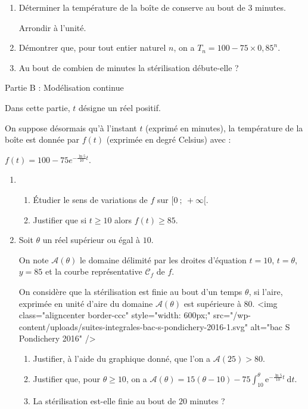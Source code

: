 \begin{enumerate}
     \item
     Déterminer la température de la boîte de conserve au bout de 3 minutes.
     \par
     Arrondir à l'unité.
     \item
     Démontrer que, pour tout entier naturel $n$, on a $T_n = 100-75 \times 0,85^n$.
     \item
     Au bout de combien de minutes la stérilisation débute-elle ?
\end{enumerate}
\begin{h3}Partie B : Modélisation continue\end{h3}
Dans cette partie, $t$ désigne un réel positif.
\par
On suppose désormais qu'à l'instant $t$ (exprimé en minutes), la température de la boîte est donnée par $f(t)$ (exprimée en degré Celsius) avec :
\begin{center}$f(t) = 100-75{e}^{- \frac{\ln 5}{10}t}$.\end{center}
\begin{enumerate}
     \item
     \begin{enumerate}
          \item
          Étudier le sens de variations de $f$ sur $[0~;~+ \infty[$.
          \item
          Justifier que si $t \geqslant 10$ alors $f(t) \geqslant 85$.
     \end{enumerate}
     \item
     Soit $\theta$ un réel supérieur ou égal à $10$.
     \par
     On note $\mathcal{A}(\theta)$ le domaine délimité par les droites d'équation $t = 10$, $t = \theta$, $y = 85$ et la courbe représentative $\mathscr{C}_f$ de $f$.
     \par
     On considère que la stérilisation est finie au bout d'un temps $\theta$, si l'aire, exprimée en unité d'aire du domaine $\mathcal{A}(\theta)$ est supérieure à $80$.
     <img class="aligncenter border-ccc" style="width: 600px;" src="/wp-content/uploads/suites-integrales-bac-s-pondichery-2016-1.svg" alt="bac S Pondichery 2016" />
     \begin{enumerate}
          \item
          Justifier, à l'aide du graphique donné, que l'on a $\mathcal{A}(25) > 80$.
          \item
          Justifier que, pour $\theta \geqslant 10$, on a $\mathcal{A}(\theta) = 15(\theta-10)-75 \int_{10}^{\theta} \text{e}^{- \frac{\ln 5}{10}t}\:\text{d}t$.
          \item
          La stérilisation est-elle finie au bout de $20$ minutes ?
     \end{enumerate}
\end{enumerate}
